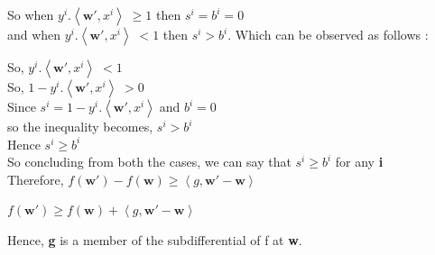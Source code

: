 \documentclass[a4paper,11pt]{article}
\begin{document}
\begin{mlsolution}
So when \begin{math}y^{i}.\left \langle \textbf{w}{}', x^{i} \right \rangle \; \geq  1\end{math} then \; \begin{math} s^{i} = b^{i} = 0 \end{math} \\

and when \begin{math}y^{i}.\left \langle \textbf{w}{}', x^{i} \right \rangle \; <  1\end{math}
then \; \begin{math} s^{i} > b^{i}\end{math}. Which can be observed as follows :
 
So, \begin{math}y^{i}.\left \langle \textbf{w}{}', x^{i} \right \rangle \; <  1 \end{math} \\

So, \begin{math} 1- y^{i}.\left \langle \textbf{w}{}', x^{i} \right \rangle \; >  0 \end{math} \\

Since \begin{math} s^{i} = 1- y^{i}.\left \langle \textbf{w}{}', x^{i} \right \rangle \; \end{math}and \begin{math} b^{i} = 0 \end{math} \\

so the inequality becomes, \begin{math} s^{i} > b^{i} \end{math}\\

Hence \begin{math} s^{i} \geq b^{i} \end{math}\\

So concluding from both the cases, we can say that \begin{math} s^{i} \geq b^{i} \end{math} for any \textbf{i}\\

Therefore, \begin{math}
f\left ( \textbf{w}{}' \right ) - f\left ( \textbf{w} \right ) \geq  \left \langle g, \textbf{w}{}' - \textbf{w} \right \rangle
\end{math}


\begin{math}
f\left ( \textbf{w}{}' \right ) \geq f\left ( \textbf{w} \right ) + \left \langle g, \textbf{w}{}' - \textbf{w} \right \rangle
\end{math}

Hence, \textbf{g} is a member of the subdifferential of f at \textbf{w}.
\end{mlsolution}
\end{document}
